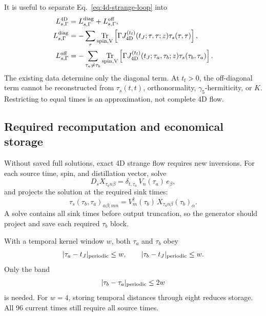 \documentclass[11pt]{article}
\numberwithin{equation}{section}
\newcommand{\tf}{t_{\mathrm f}}
\DeclareMathOperator{\Tr}{Tr}
\begin{document}
It is useful to separate Eq.~\eqref{eq:4d-strange-loop} into
\begin{align}
  L_{s,\Gamma}^{\rm 4D}
  &=
  L_{s,\Gamma}^{\rm diag}
  +
  L_{s,\Gamma}^{\rm off},
  \\
  L_{s,\Gamma}^{\rm diag}
  &=
  -\sum_{\tau}
  \Tr_{\rm spin,V}
  \left[
    \Gamma J_{\rm 4D}^{(\tf)}(t_J;\tau,\tau;z)
    \tau_s(\tau,\tau)
  \right],
  \\
  L_{s,\Gamma}^{\rm off}
  &=
  -\sum_{\tau_a\neq\tau_b}
  \Tr_{\rm spin,V}
  \left[
    \Gamma J_{\rm 4D}^{(\tf)}(t_J;\tau_a,\tau_b;z)
    \tau_s(\tau_b,\tau_a)
  \right].
  \label{eq:4d-strange-diag-offdiag}
\end{align}
The existing data determine only the diagonal term. At \(\tf>0\), the
off-diagonal term cannot be reconstructed from \(\tau_s(t,t)\),
orthonormality, \(\gamma_5\)-hermiticity, or \(K\). Restricting to equal times
is an approximation, not complete 4D flow.

\subsection{Required recomputation and economical storage}

Without saved full solutions, exact 4D strange flow requires new inversions.
For each source time, spin, and distillation vector, solve
\begin{equation}
  D_s X_{\tau_a n\beta}
  =
  \delta_{t,\tau_a}\,V_n(\tau_a)\,e_\beta ,
  \label{eq:strange-required-inversion}
\end{equation}
and projects the solution at the required sink times:
\begin{equation}
  \tau_s(\tau_b,\tau_a)_{\alpha\beta;mn}
  =
  V_m^\dagger(\tau_b)\,
  X_{\tau_a n\beta}(\tau_b)_\alpha .
  \label{eq:strange-required-projection}
\end{equation}
A solve contains all sink times before output truncation, so the generator
should project and save each required \(\tau_b\) block.

With a temporal kernel window \(w\), both \(\tau_a\) and \(\tau_b\) obey
\begin{equation}
  |\tau_a-t_J|_{\rm periodic}\leq w,
  \qquad
  |\tau_b-t_J|_{\rm periodic}\leq w.
  \label{eq:window-two-times}
\end{equation}
Only the band
\begin{equation}
  |\tau_b-\tau_a|_{\rm periodic}\leq2w
  \label{eq:banded-strange-storage}
\end{equation}
is needed. For \(w=4\), storing temporal distances through eight reduces
storage. All 96 current times still require all source times.
\end{document}
